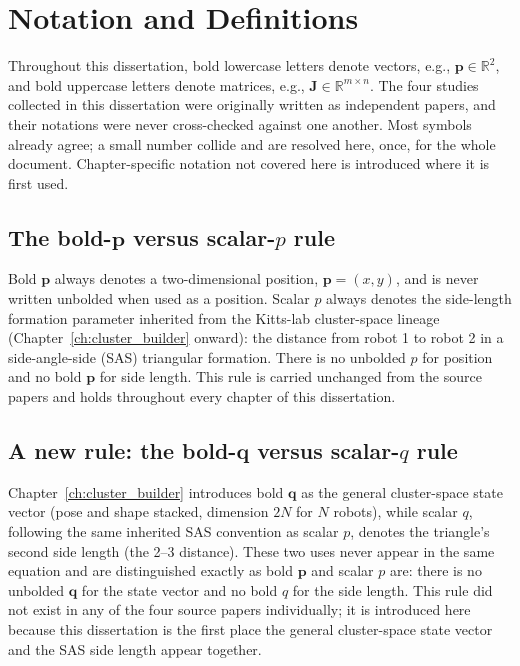 \documentclass[12pt, letterpaper, oneside]{report}
\begin{document}
\section{Notation and Definitions}
\label{sec:notation}

Throughout this dissertation, bold lowercase letters denote vectors, e.g.,
$\mathbf{p} \in \mathbb{R}^2$, and bold uppercase letters denote matrices,
e.g., $\mathbf{J} \in \mathbb{R}^{m \times n}$. The four studies collected
in this dissertation were originally written as independent papers, and
their notations were never cross-checked against one another. Most symbols
already agree; a small number collide and are resolved here, once, for the
whole document. Chapter-specific notation not covered here is introduced
where it is first used.

\subsection*{The bold-\texorpdfstring{$\mathbf{p}$}{p} versus scalar-\texorpdfstring{$p$}{p} rule}

Bold $\mathbf{p}$ always denotes a two-dimensional position,
$\mathbf{p} = (x,y)$, and is never written unbolded when used as a position.
Scalar $p$ always denotes the side-length formation parameter inherited from
the Kitts-lab cluster-space lineage (Chapter~\ref{ch:cluster_builder} onward):
the distance from robot 1 to robot 2 in a side-angle-side (SAS) triangular
formation. There is no unbolded $p$ for position and no bold $\mathbf{p}$ for
side length. This rule is carried unchanged from the source papers and holds
throughout every chapter of this dissertation.

\subsection*{A new rule: the bold-\texorpdfstring{$\mathbf{q}$}{q} versus scalar-\texorpdfstring{$q$}{q} rule}

Chapter~\ref{ch:cluster_builder} introduces bold $\mathbf{q}$ as the general
cluster-space state vector (pose and shape stacked, dimension $2N$ for $N$
robots), while scalar $q$, following the same inherited SAS convention as
scalar $p$, denotes the triangle's second side length (the 2--3 distance).
These two uses never appear in the same equation and are distinguished
exactly as bold $\mathbf{p}$ and scalar $p$ are: there is no unbolded
$\mathbf{q}$ for the state vector and no bold $q$ for the side length. This
rule did not exist in any of the four source papers individually; it is
introduced here because this dissertation is the first place the general
cluster-space state vector and the SAS side length appear together.
\end{document}
